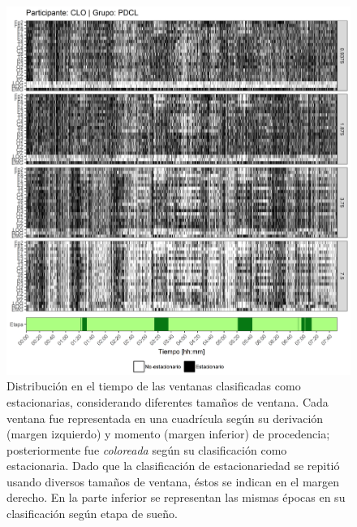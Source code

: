 \documentclass[12pt,letterpaper,draft]{book}
\begin{document}
\begin{figure}
\centering
\includegraphics[width=\linewidth]
{./scripts_graf_res/CLO_patrones_1.png}
\caption[Distribución en el tiempo de las ventanas clasificadas como estacionarias, considerando diferentes tamaños de ventana]{Distribución en el tiempo de las ventanas clasificadas como estacionarias, considerando diferentes tamaños de ventana. 
Cada ventana fue representada en una cuadrícula según su derivación (margen izquierdo) y momento (margen inferior) de procedencia; posteriormente fue \textit{coloreada} según su clasificación como estacionaria.
Dado que la clasificación de estacionariedad se repitió usando diversos tamaños de ventana, éstos se indican en el margen derecho.
En la parte inferior se representan las mismas épocas en su clasificación según etapa de sueño.}
\end{figure}
\end{document}
